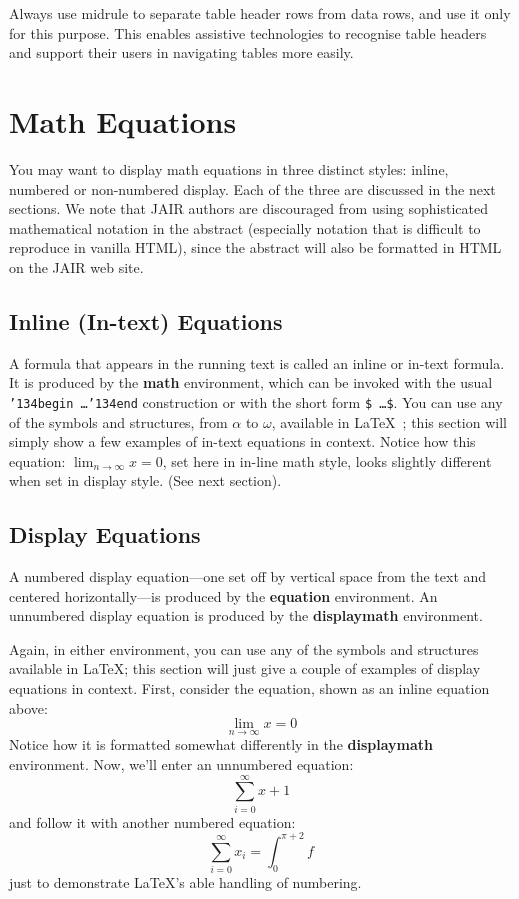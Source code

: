 \documentclass[manuscript, screen, review]{jair}
\begin{document}
Always use midrule to separate table header rows from data rows, and
use it only for this purpose. This enables assistive technologies to
recognise table headers and support their users in navigating tables
more easily.

\section{Math Equations}
You may want to display math equations in three distinct styles:
inline, numbered or non-numbered display.  Each of the three are
discussed in the next sections. We note that JAIR authors are discouraged from using sophisticated mathematical notation in the abstract (especially notation that is difficult to reproduce in vanilla HTML), since the abstract will also be formatted in HTML on the JAIR web site. 

\subsection{Inline (In-text) Equations}
A formula that appears in the running text is called an inline or
in-text formula.  It is produced by the \textbf{math} environment,
which can be invoked with the usual
\texttt{{\char'134}begin\,\ldots{\char'134}end} construction or with
the short form \texttt{\$\,\ldots\$}. You can use any of the symbols
and structures, from $\alpha$ to $\omega$, available in
\LaTeX~\cite{Lamport:LaTeX}; this section will simply show a few
examples of in-text equations in context. Notice how this equation:
\begin{math}
  \lim_{n\rightarrow \infty}x=0
\end{math},
set here in in-line math style, looks slightly different when
set in display style.  (See next section).

\subsection{Display Equations}
A numbered display equation---one set off by vertical space from the
text and centered horizontally---is produced by the \textbf{equation}
environment. An unnumbered display equation is produced by the
\textbf{displaymath} environment.

Again, in either environment, you can use any of the symbols and
structures available in \LaTeX\@; this section will just give a couple
of examples of display equations in context.  First, consider the
equation, shown as an inline equation above:
\begin{equation}
  \lim_{n\rightarrow \infty}x=0
\end{equation}
Notice how it is formatted somewhat differently in
the \textbf{displaymath}
environment.  Now, we'll enter an unnumbered equation:
\begin{displaymath}
  \sum_{i=0}^{\infty} x + 1
\end{displaymath}
and follow it with another numbered equation:
\begin{equation}
  \sum_{i=0}^{\infty}x_i=\int_{0}^{\pi+2} f
\end{equation}
just to demonstrate \LaTeX's able handling of numbering.
\end{document}
